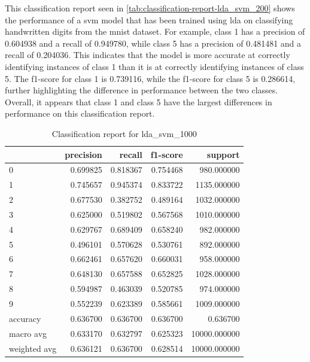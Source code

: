 This classification report seen in \ref{tab:classification-report-lda_svm_200} shows the performance of a \gls{svm} model that has been trained using \gls{lda} on classifying handwritten digits from the \gls{mnist} dataset. For example, class 1 has a precision of 0.604938 and a recall of 0.949780, while class 5 has a precision of 0.481481 and a recall of 0.204036. This indicates that the model is more accurate at correctly identifying instances of class 1 than it is at correctly identifying instances of class 5. The f1-score for class 1 is 0.739116, while the f1-score for class 5 is 0.286614, further highlighting the difference in performance between the two classes. Overall, it appears that class 1 and class 5 have the largest differences in performance on this classification report.

\begin{table}[htb!]
    \centering
    \caption{Classification report for lda_svm_1000}
    \label{tab:classification-report-lda_svm_1000}
    \begin{tabular}{lrrrr}
    \toprule
     & precision & recall & f1-score & support \\
    \midrule
    0 & 0.699825 & 0.818367 & 0.754468 & 980.000000 \\
    1 & 0.745657 & 0.945374 & 0.833722 & 1135.000000 \\
    2 & 0.677530 & 0.382752 & 0.489164 & 1032.000000 \\
    3 & 0.625000 & 0.519802 & 0.567568 & 1010.000000 \\
    4 & 0.629767 & 0.689409 & 0.658240 & 982.000000 \\
    5 & 0.496101 & 0.570628 & 0.530761 & 892.000000 \\
    6 & 0.662461 & 0.657620 & 0.660031 & 958.000000 \\
    7 & 0.648130 & 0.657588 & 0.652825 & 1028.000000 \\
    8 & 0.594987 & 0.463039 & 0.520785 & 974.000000 \\
    9 & 0.552239 & 0.623389 & 0.585661 & 1009.000000 \\
    accuracy & 0.636700 & 0.636700 & 0.636700 & 0.636700 \\
    macro avg & 0.633170 & 0.632797 & 0.625323 & 10000.000000 \\
    weighted avg & 0.636121 & 0.636700 & 0.628514 & 10000.000000 \\
    \bottomrule
    \end{tabular}
    \end{table}

